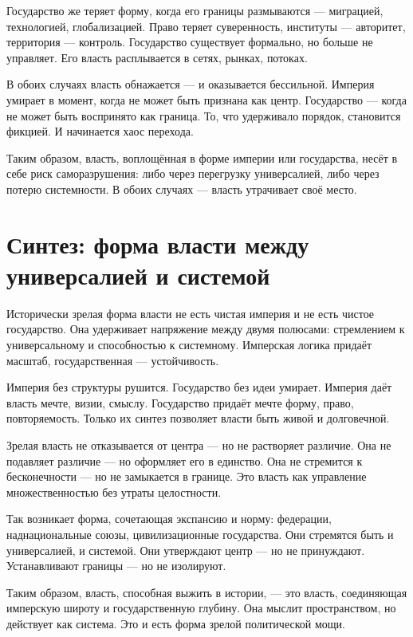 Государство же теряет форму, когда его границы размываются — миграцией, технологией, глобализацией. Право теряет суверенность, институты — авторитет, территория — контроль. Государство существует формально, но больше не управляет. Его власть расплывается в сетях, рынках, потоках.

В обоих случаях власть обнажается — и оказывается бессильной. Империя умирает в момент, когда не может быть признана как центр. Государство — когда не может быть воспринято как граница. То, что удерживало порядок, становится фикцией. И начинается хаос перехода.

Таким образом, власть, воплощённая в форме империи или государства, несёт в себе риск саморазрушения: либо через перегрузку универсалией, либо через потерю системности. В обоих случаях — власть утрачивает своё место.

\section{Синтез: форма власти между универсалией и системой}

Исторически зрелая форма власти не есть чистая империя и не есть чистое государство. Она удерживает напряжение между двумя полюсами: стремлением к универсальному и способностью к системному. Имперская логика придаёт масштаб, государственная — устойчивость.

Империя без структуры рушится. Государство без идеи умирает. Империя даёт власть мечте, визии, смыслу. Государство придаёт мечте форму, право, повторяемость. Только их синтез позволяет власти быть живой и долговечной.

Зрелая власть не отказывается от центра — но не растворяет различие. Она не подавляет различие — но оформляет его в единство. Она не стремится к бесконечности — но не замыкается в границе. Это власть как управление множественностью без утраты целостности.

Так возникает форма, сочетающая экспансию и норму: федерации, наднациональные союзы, цивилизационные государства. Они стремятся быть и универсалией, и системой. Они утверждают центр — но не принуждают. Устанавливают границы — но не изолируют.

Таким образом, власть, способная выжить в истории, — это власть, соединяющая имперскую широту и государственную глубину. Она мыслит пространством, но действует как система. Это и есть форма зрелой политической мощи.

